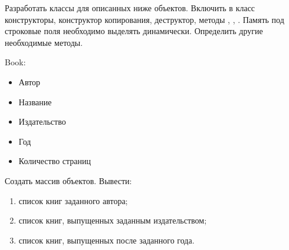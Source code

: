 
Разработать классы для описанных ниже объектов. Включить в класс
конструкторы, конструктор копирования, деструктор, методы ,
, . Память под строковые поля необходимо выделять
динамически. Определить другие необходимые методы.

Book:
\begin{itemize}
	\item Автор
	\item Название
	\item Издательство
	\item Год
	\item Количество страниц
\end{itemize}

Создать массив объектов. Вывести:
\begin{enumerate}
	\item список книг заданного автора;
	\item список книг, выпущенных заданным издательством;
	\item список книг, выпущенных после заданного года.
\end{enumerate}
